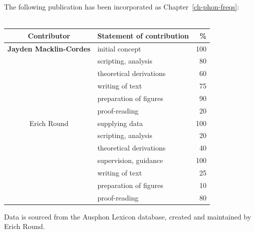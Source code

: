 \cleartoevenpage
\pagestyle{empty}	

\noindent
The following publication has been incorporated as Chapter~\ref{ch-phon-freqs}:\\

\noindent
{}\\

\begin{table}[h]
	\centering
	\begin{tabular}{clr}
		\toprule
		Contributor & Statement of contribution & \% \\
		\midrule
		\textbf{Jayden Macklin-Cordes}	& initial concept			& 100 \\
		                                & scripting, analysis     	& 80  \\
		                                & theoretical derivations 	& 60  \\
		                                & writing of text 			& 75  \\
		                                & preparation of figures 	& 90 \\
										& proof-reading				& 20  \\
		\midrule
		Erich Round						& supplying data            & 100 \\
		                                & scripting, analysis       & 20  \\
		                                & theoretical derivations 	& 40  \\
		                                & supervision, guidance 	& 100 \\
		                                & writing of text 			& 25  \\
		                                & preparation of figures 	& 10 \\
										& proof-reading				& 80  \\
		\bottomrule
	\end{tabular}
\end{table}

\noindent
Data is sourced from the Ausphon Lexicon database, created and maintained by Erich Round.\\


